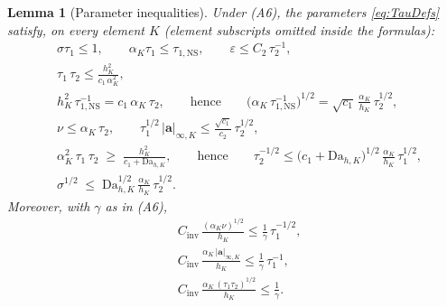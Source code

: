 \documentclass[11pt]{article}
\newtheorem{lemma}[theorem]{Lemma}
\theoremstyle{remark}
\newcommand{\ba}{\boldsymbol{a}}
\newcommand{\tns}{\tau_{1,\mathrm{NS}}}
\newcommand{\Dah}{\mathrm{Da}_{h,K}}
\begin{document}
\begin{lemma}[Parameter inequalities]
\label{lem:parameters}
Under \textup{(A6)}, the parameters \cref{eq:TauDefs} satisfy, on every element $K$
(element subscripts omitted inside the formulas):
\begin{align}
  &\sigma\tau_1 \le 1,
  \qquad
  \alpha_K \tau_1 \le \tns,
  \qquad
  \varepsilon \le C_2\, \tau_2^{-1},
  \tag{P1}\label{eq:P1}\\
  &\tau_1\,\tau_2 \le \frac{h_K^2}{c_1\,\alpha_K^2},
  \tag{P2}\label{eq:P2}\\
  &h_K^2\,\tns^{-1} = c_1\,\alpha_K\,\tau_2,
  \qquad\text{hence}\qquad
  \bigl(\alpha_K\,\tns^{-1}\bigr)^{1/2} = \sqrt{c_1}\,\frac{\alpha_K}{h_K}\,\tau_2^{1/2},
  \tag{P3}\label{eq:P3}\\
  &\nu \le \alpha_K\,\tau_2,
  \qquad
  \tau_1^{1/2}\,|\ba|_{\infty,K} \le \frac{\sqrt{c_1}}{c_2}\,\tau_2^{1/2},
  \tag{P4}\label{eq:P4}\\
  &\alpha_K^2\,\tau_1\,\tau_2 \;\ge\; \frac{h_K^2}{c_1 + \Dah},
  \qquad\text{hence}\qquad
  \tau_2^{-1/2} \le \bigl(c_1 + \Dah\bigr)^{1/2}\,\frac{\alpha_K}{h_K}\,\tau_1^{1/2},
  \tag{P5}\label{eq:P5}\\
  &\sigma^{1/2} \;\le\; \Dah^{1/2}\,\frac{\alpha_K}{h_K}\,\tau_2^{1/2}.
  \tag{P6}\label{eq:P6}
\end{align}
Moreover, with $\gamma$ as in \textup{(A6)},
\begin{align}
  &C_{\mathrm{inv}}\,\frac{(\alpha_K\nu)^{1/2}}{h_K} \le \frac{1}{\gamma}\,\tau_1^{-1/2},
  \tag{K1}\label{eq:K1}\\
  &C_{\mathrm{inv}}\,\frac{\alpha_K\,|\ba|_{\infty,K}}{h_K} \le \frac{1}{\gamma}\,\tau_1^{-1},
  \tag{K2}\label{eq:K2}\\
  &C_{\mathrm{inv}}\,\frac{\alpha_K\,(\tau_1\tau_2)^{1/2}}{h_K} \le \frac{1}{\gamma}.
  \tag{K3}\label{eq:K3}
\end{align}
\end{lemma}
\end{document}
